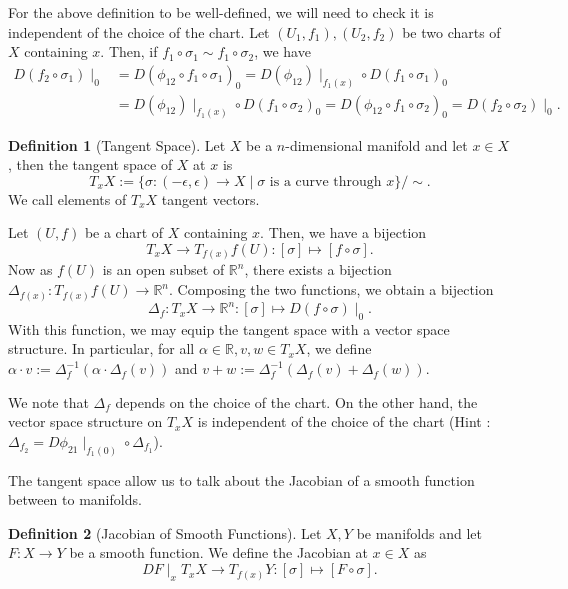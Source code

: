 \documentclass[]{article}
\theoremstyle{definition}
\theoremstyle{definition}
\newtheorem{definition}{Definition}[section]
\begin{document}
For the above definition to be well-defined, we will need to check it is 
independent of the choice of the chart. Let \((U_1, f_1), (U_2, f_2)\) be two 
charts of \(X\) containing \(x\). Then, if 
\(f_1 \circ \sigma_1 \sim f_1 \circ \sigma_2\), we have 
\[\begin{split}
  D(f_2 \circ \sigma_1)\mid_0 & = D(\phi_{12} \circ f_1 \circ \sigma_1)_0 
    = D(\phi_{12})\mid_{f_1(x)} \circ D(f_1 \circ \sigma_1)_0 \\ 
  & = D(\phi_{12})\mid_{f_1(x)} \circ D(f_1 \circ \sigma_2)_0 
    = D(\phi_{12} \circ f_1 \circ \sigma_2)_0 
    = D(f_2 \circ \sigma_2)\mid_0.
\end{split}\]

\begin{definition}[Tangent Space]
  Let \(X\) be a \(n\)-dimensional manifold and let \(x \in X\), then the 
  tangent space of \(X\) at \(x\) is 
  \[T_xX := \{\sigma : (-\epsilon, \epsilon) \to X \mid \sigma 
    \text{ is a curve through } x\} / \sim.\]
  We call elements of \(T_xX\) tangent vectors.
\end{definition}

Let \((U, f)\) be a chart of \(X\) containing \(x\). Then, we have a bijection 
\[T_x X \to T_{f(x)}f(U) : [\sigma] \mapsto [f \circ \sigma].\]
Now as \(f(U)\) is an open subset of \(\mathbb{R}^n\), there exists a bijection 
\(\Delta_{f(x)} : T_{f(x)}f(U) \to \mathbb{R}^n\). Composing the two functions, 
we obtain a bijection 
\[\Delta_f : T_xX \to \mathbb{R}^n : [\sigma] \mapsto D(f \circ \sigma)\mid_0.\]
With this function, we may equip the tangent space with a vector space 
structure. In particular, for all \(\alpha \in \mathbb{R}, v, w \in T_xX\), 
we define \(\alpha \cdot v := \Delta_f^{-1}(\alpha \cdot \Delta_f(v))\) and 
\(v + w := \Delta^{-1}_f (\Delta_f(v) + \Delta_f(w)).\)

We note that \(\Delta_f\) depends on the choice of the chart. On the other 
hand, the vector space structure on \(T_xX\) is independent of the choice of 
the chart (Hint : \(\Delta_{f_2} = D\phi_{21}\mid_{f_1(0)} \circ \Delta_{f_1}\)).

The tangent space allow us to talk about the Jacobian of a smooth function between 
to manifolds. 

\begin{definition}[Jacobian of Smooth Functions]
  Let \(X, Y\) be manifolds and let \(F : X \to Y\) be a smooth function. 
  We define the Jacobian at \(x \in X\) as 
  \[DF\mid_x T_xX \to T_{f(x)}Y : [\sigma] \mapsto [F \circ \sigma].\]
\end{definition}
\end{document}
